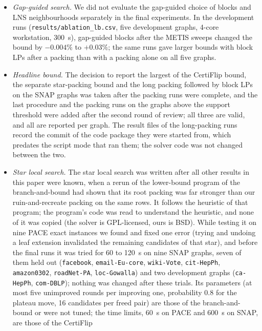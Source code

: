 \begin{itemize}
heuristic-track instances that coincide with development graphs are
reported separately; the other 190 were not used for tuning, but they are not
held out in the strict sense.
\item \emph{Gap-guided search.}  We did not evaluate the gap-guided choice of
blocks and LNS neighbourhoods separately in the final experiments.  In the
development runs (\texttt{results/ablation\_lb.csv}, five development graphs,
4-core workstation, \SI{300}{s}), gap-guided blocks after the METIS sweeps
changed the bound by $-0.004\%$ to $+0.03\%$; the same runs gave larger
bounds with block LPs after a packing than with a packing alone on all five
graphs.
\item \emph{Headline bound.}  The decision to report the largest of the
CertiFlip bound, the separate star-packing bound and the long packing
followed by block LPs on the SNAP graphs was taken after the packing runs
were complete, and the last procedure and the packing runs on the graphs
above the support threshold were added after the second round of review;
all three are valid, and all are reported per graph.  The result files of
the long-packing runs record the commit of the code package they were
started from, which predates the script mode that ran them; the solver
code was not changed between the two.
\item \emph{Star local search.}  The star local search was written after all
other results in this paper were known, when a rerun of the lower-bound
program of the branch-and-bound had shown that its root packing was far
stronger than our ruin-and-recreate packing on the same rows.  It follows the
heuristic of that program; the program's code was read to understand the
heuristic, and none of it was copied (the solver is GPL-licensed, ours is
BSD).  While testing it on nine PACE exact instances we found and fixed one
error (trying and undoing a leaf extension invalidated the remaining
candidates of that star), and before the final runs it was tried for 60 to
\SI{120}{s} on nine SNAP graphs, seven of them held out (\texttt{facebook},
\texttt{email-Eu-core}, \texttt{wiki-Vote}, \texttt{cit-HepPh},
\texttt{amazon0302}, \texttt{roadNet-PA}, \texttt{loc-Gowalla}) and two
development graphs (\texttt{ca-HepPh}, \texttt{com-DBLP}); nothing was changed
after these trials.  Its parameters (at most five unimproved rounds per
improving one, probability $0.8$ for the plateau move, 16 candidates per
freed pair) are those of the branch-and-bound or were not tuned; the time
limits, \SI{60}{s} on PACE and \SI{600}{s} on SNAP, are those of the CertiFlip

\end{itemize}
